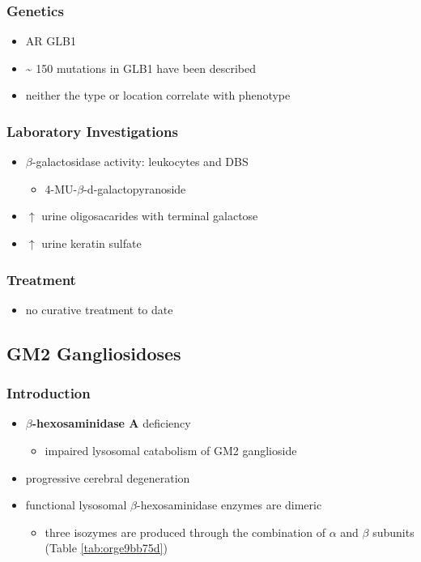 \documentclass[12pt]{scrartcl}
\begin{document}
\subsubsection{Genetics}
\label{sec:org94c4fb5}
\begin{itemize}
\item AR GLB1
\item \textasciitilde{} 150 mutations in GLB1 have been described
\item neither the type or location correlate with phenotype
\end{itemize}
\subsubsection{Laboratory Investigations}
\label{sec:org13f2c3d}
\begin{itemize}
\item \(\beta\)-galactosidase activity: leukocytes and DBS
\begin{itemize}
\item 4-MU-\(\beta\)-d-galactopyranoside
\end{itemize}
\item \(\uparrow\) urine oligosacarides with terminal galactose
\item \(\uparrow\) urine keratin sulfate
\end{itemize}

\subsubsection{Treatment}
\label{sec:orga605266}
\begin{itemize}
\item no curative treatment to date
\end{itemize}
\subsection{GM2 Gangliosidoses}
\label{sec:orgae99627}
\subsubsection{Introduction}
\label{sec:orgc23f6f3}
\begin{itemize}
\item \textbf{\(\beta\)-hexosaminidase A} deficiency 
\begin{itemize}
\item impaired lysosomal catabolism of GM2 ganglioside
\end{itemize}
\item progressive cerebral degeneration
\item functional lysosomal \(\beta\)-hexosaminidase enzymes are dimeric
\begin{itemize}
\item three isozymes are produced through the combination of \(\alpha\)
and \(\beta\) subunits (Table \ref{tab:orge9bb75d})
\end{itemize}
\end{itemize}
\end{document}
